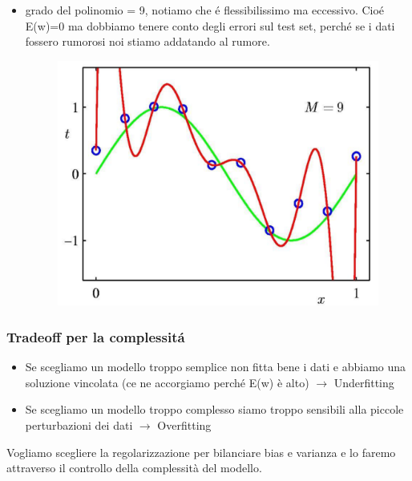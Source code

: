 \documentclass{article}
\begin{document}
\begin{itemize}
    \item grado del polinomio = 9, notiamo che é flessibilissimo ma eccessivo. Cioé E(w)=0 ma dobbiamo tenere conto degli errori sul test set, perché se i dati fossero rumorosi noi stiamo addatando al rumore.
    \begin{figure}[H]
    \centering
    \includegraphics[scale=0.3]{Images/9gradepol.png}
    \end{figure}
\end{itemize}

\subsubsection{Tradeoff per la complessitá}
\begin{itemize}
    \item Se scegliamo un modello troppo semplice non fitta bene i dati e abbiamo una soluzione vincolata (ce ne accorgiamo perché E(w) è alto) $\rightarrow$ Underfitting
    \item Se scegliamo un modello troppo complesso siamo troppo sensibili alla piccole perturbazioni dei dati $\rightarrow$ Overfitting
\end{itemize}
Vogliamo scegliere la regolarizzazione per bilanciare bias e varianza e lo faremo attraverso il controllo della complessità del modello.
 
\end{document}
